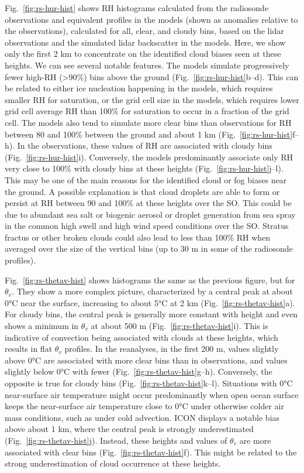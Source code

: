 \documentclass[draft]{agujournal2019}
\begin{document}
Fig.~\ref{fig:rs-hur-hist} shows RH histograms calculated from the radiosonde observations and equivalent profiles in the models (shown as anomalies relative to the observations), calculated for all, clear, and cloudy bins, based on the lidar observations and the simulated lidar backscatter in the models. Here, we show only the first 2 km to concentrate on the identified cloud biases seen at these heights. We can see several notable features. The models simulate progressively fewer high-RH (\textgreater 90\%) bins above the ground (Fig.~\ref{fig:rs-hur-hist}b--d). This can be related to either ice nucleation happening in the models, which requires smaller RH for saturation, or the grid cell size in the models, which requires lower grid cell average RH than 100\% for saturation to occur in a fraction of the grid cell. The models also tend to simulate more clear bins than observations for RH between 80 and 100\% between the ground and about 1 km (Fig.~\ref{fig:rs-hur-hist}f--h). In the observations, these values of RH are associated with cloudy bins (Fig.~\ref{fig:rs-hur-hist}i). Conversely, the models predominantly associate only RH very close to 100\% with cloudy bins at these heights (Fig.~\ref{fig:rs-hur-hist}j--l). This may be one of the main reasons for the identified cloud or fog biases near the ground. A possible explanation is that cloud droplets are able to form or persist at RH between 90 and 100\% at these heights over the SO. This could be due to abundant sea salt or biogenic aerosol or droplet generation from sea spray in the common high swell and high wind speed conditions over the SO. Stratus fractus or other broken clouds could also lead to less than 100\% RH when averaged over the size of the vertical bins (up to 30 m in some of the radiosonde profiles).

Fig.~\ref{fig:rs-thetav-hist} shows histograms the same as the previous figure, but for $\theta_v$. They show a more complex picture, characterized by a central peak at about 0°C near the surface, increasing to about 5°C at 2 km (Fig.~\ref{fig:rs-thetav-hist}a). For cloudy bins, the central peak is generally more constant with height and even shows a minimum in $\theta_v$ at about 500 m (Fig.~\ref{fig:rs-thetav-hist}i). This is indicative of convection being associated with clouds at these heights, which results in flat $\theta_v$ profiles. In the reanalyses, in the first 200 m, values slightly above 0°C are associated with more clear bins than in observations, and values slightly below 0°C with fewer (Fig.~\ref{fig:rs-thetav-hist}g--h). Conversely, the opposite is true for cloudy bins (Fig.~\ref{fig:rs-thetav-hist}k--l). Situations with 0°C near-surface air temperature might occur predominantly when open ocean surface keeps the near-surface air temperature close to 0°C under otherwise colder air mass conditions, such as under cold advection. ICON displays a notable bias above about 1 km, where the central peak is strongly underestimated (Fig.~\ref{fig:rs-thetav-hist}j). Instead, these heights and values of $\theta_v$ are more associated with clear bins (Fig.~\ref{fig:rs-thetav-hist}f). This might be related to the strong underestimation of cloud occurrence at these heights.
\end{document}
